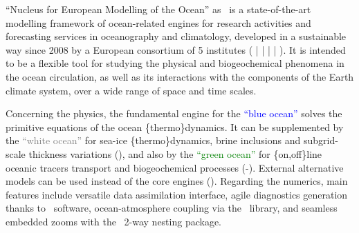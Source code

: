 
``Nucleus for European Modelling of the Ocean'' as \NEMO\ is a state-of-the-art modelling framework of
ocean-related engines for research activities and forecasting services in oceanography and climatology,
developed in a sustainable way since 2008 by a European consortium of 5 institutes
( |  |  |  | ).
It is intended to be a flexible tool for studying the physical and biogeochemical phenomena in
the ocean circulation, as well as its interactions with the components of the Earth climate system,
over a wide range of space and time scales.

Concerning the physics, the fundamental engine for the \textcolor{blue}{``blue ocean''} solves
the primitive equations of the ocean \{thermo\}dynamics.
It can be supplemented by the \textcolor{gray}{``white ocean''} for sea-ice \{thermo\}dynamics,
brine inclusions and subgrid-scale thickness variations (\SIcube), and also by
the \textcolor{green}{``green ocean''} for \{on,off\}line oceanic tracers transport and
biogeochemical processes (\TOP-\PISCES).
External alternative models can be used instead of the core engines (\eg \BFM).
Regarding the numerics, main features include versatile data assimilation interface,
agile diagnostics generation thanks to \XIOS\ software,
ocean-atmosphere coupling via the \OASIS\ library, and
seamless embedded zooms with the \AGRIF\ 2-way nesting package.
